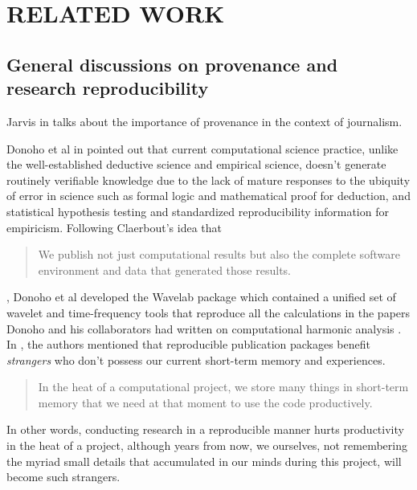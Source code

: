 
\chapter{RELATED WORK}
\label{related-work}

\section{General discussions on provenance and research reproducibility}
Jarvis in \cite{jarvis2010importance} talks about the importance of provenance in the context of journalism. 

Donoho et al in \cite{donoho2009reproducible} pointed out that current computational science practice, unlike the well-established deductive science and empirical science, doesn't generate routinely verifiable knowledge due to the lack of mature responses to the ubiquity of error in science such as formal logic and mathematical proof for deduction, and statistical hypothesis testing and standardized reproducibility information for empiricism. Following Claerbout's idea that
\begin{quote}
	We publish not just computational results
	but also the complete software environment
	and data that generated those results.
\end{quote}
, Donoho et al developed the Wavelab package which contained a unified set of wavelet and time-frequency tools that reproduce all the calculations in the papers Donoho and his collaborators had written on computational harmonic analysis \cite{buckheit1995wavelab}. In \cite{donoho2009reproducible}, the authors mentioned that reproducible publication packages benefit \emph{strangers} who don't possess our current short-term memory and experiences.
\begin{quote}
	In the heat
	of a computational project, we store many things
	in short-term memory that we need at that moment
	to use the code productively.
\end{quote}
In other words, conducting research in a reproducible manner hurts productivity in the heat of a project, although years from now, we ourselves, not remembering the myriad small details that accumulated in our minds during this project, will become such strangers.

